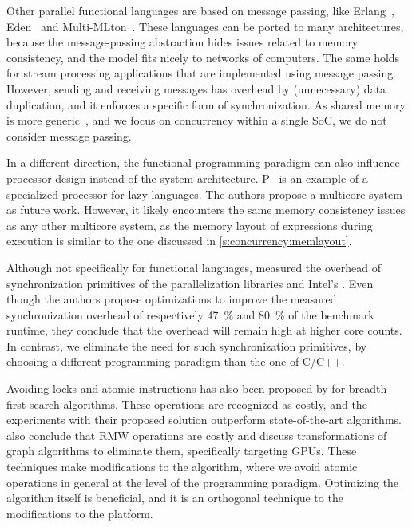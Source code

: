 Other parallel functional languages are based on message passing, like Erlang~\cite{armstrong:erlang}, Eden~\cite{loogen:eden} and Multi-MLton~\cite{sivaramakrishnan:parasitic_threads}.
These languages can be ported to many architectures, because the message-passing abstraction hides issues related to memory consistency, and the model fits nicely to networks of computers.
The same holds for stream processing applications that are implemented using message passing.
However, sending and receiving messages has overhead by (unnecessary) data duplication, and it enforces a specific form of synchronization.
As shared memory is more generic~\cite{culler:comp_arch}, and we focus on concurrency within a single \acl{SoC}, we do not consider message passing.

In a different direction, the functional programming paradigm can also influence processor design instead of the system architecture.
P~\cite{boeijink:pilgrim} is an example of a specialized processor for lazy languages.
The authors propose a multicore system as future work.
However, it likely encounters the same memory consistency issues as any other multicore system, as the memory layout of expressions during execution is similar to the one discussed in \cref{s:concurrency:memlayout}.

Although not specifically for functional languages, \citet{bhattacharjee:par_libs} measured the overhead of synchronization primitives of the parallelization libraries  and Intel's .
Even though the authors propose optimizations to improve the measured synchronization overhead of respectively \SI{47}{\percent} and \SI{80}{\percent} of the benchmark runtime, they conclude that the overhead will remain high at higher core counts.
In contrast, we eliminate the need for such synchronization primitives, by choosing a different programming paradigm than the one of C/C++.

Avoiding locks and atomic instructions has also been proposed by \citet{tithi:avoid_lock} for breadth-first search algorithms.
These operations are recognized as costly, and the experiments with their proposed solution outperform state-of-the-art algorithms.
\citet{nasre:atomic_free_gpu} also conclude that \ac{RMW} operations are costly and discuss transformations of graph algorithms to eliminate them, specifically targeting \acp{GPU}.
These techniques make modifications to the algorithm, where we avoid atomic operations in general at the level of the programming paradigm.
Optimizing the algorithm itself is beneficial, and it is an orthogonal technique to the modifications to the platform.

